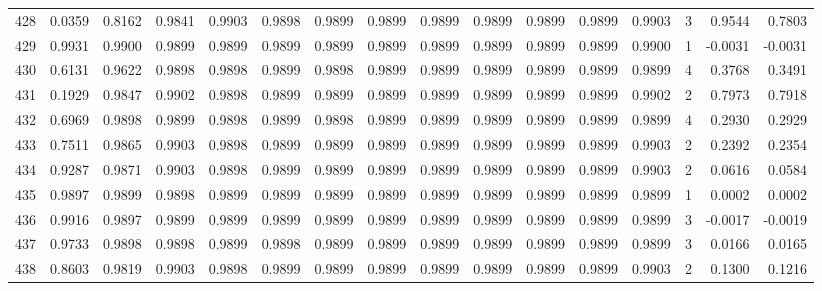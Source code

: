 \begin{tabular}{lrrrrrrrrrrrrrrr}
428 &      0.0359 &  0.8162 &  0.9841 &  0.9903 &  0.9898 &  0.9899 &  0.9899 &  0.9899 &  0.9899 &  0.9899 &   0.9899 &     0.9903 &      3 &                    0.9544 &                     0.7803 \\
429 &      0.9931 &  0.9900 &  0.9899 &  0.9899 &  0.9899 &  0.9899 &  0.9899 &  0.9899 &  0.9899 &  0.9899 &   0.9899 &     0.9900 &      1 &                   -0.0031 &                    -0.0031 \\
430 &      0.6131 &  0.9622 &  0.9898 &  0.9898 &  0.9899 &  0.9898 &  0.9899 &  0.9899 &  0.9899 &  0.9899 &   0.9899 &     0.9899 &      4 &                    0.3768 &                     0.3491 \\
431 &      0.1929 &  0.9847 &  0.9902 &  0.9898 &  0.9899 &  0.9899 &  0.9899 &  0.9899 &  0.9899 &  0.9899 &   0.9899 &     0.9902 &      2 &                    0.7973 &                     0.7918 \\
432 &      0.6969 &  0.9898 &  0.9899 &  0.9898 &  0.9899 &  0.9898 &  0.9899 &  0.9899 &  0.9899 &  0.9899 &   0.9899 &     0.9899 &      4 &                    0.2930 &                     0.2929 \\
433 &      0.7511 &  0.9865 &  0.9903 &  0.9898 &  0.9899 &  0.9899 &  0.9899 &  0.9899 &  0.9899 &  0.9899 &   0.9899 &     0.9903 &      2 &                    0.2392 &                     0.2354 \\
434 &      0.9287 &  0.9871 &  0.9903 &  0.9898 &  0.9899 &  0.9899 &  0.9899 &  0.9899 &  0.9899 &  0.9899 &   0.9899 &     0.9903 &      2 &                    0.0616 &                     0.0584 \\
435 &      0.9897 &  0.9899 &  0.9898 &  0.9899 &  0.9899 &  0.9899 &  0.9899 &  0.9899 &  0.9899 &  0.9899 &   0.9899 &     0.9899 &      1 &                    0.0002 &                     0.0002 \\
436 &      0.9916 &  0.9897 &  0.9899 &  0.9899 &  0.9899 &  0.9899 &  0.9899 &  0.9899 &  0.9899 &  0.9899 &   0.9899 &     0.9899 &      3 &                   -0.0017 &                    -0.0019 \\
437 &      0.9733 &  0.9898 &  0.9898 &  0.9899 &  0.9898 &  0.9899 &  0.9899 &  0.9899 &  0.9899 &  0.9899 &   0.9899 &     0.9899 &      3 &                    0.0166 &                     0.0165 \\
438 &      0.8603 &  0.9819 &  0.9903 &  0.9898 &  0.9899 &  0.9899 &  0.9899 &  0.9899 &  0.9899 &  0.9899 &   0.9899 &     0.9903 &      2 &                    0.1300 &                     0.1216 \\

\end{tabular}
